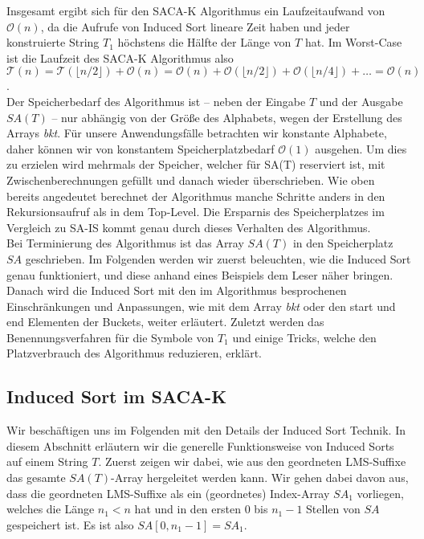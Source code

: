 Insgesamt ergibt sich für den SACA-K Algorithmus ein Laufzeitaufwand von $\mathcal O(n)$, da die Aufrufe von Induced Sort lineare Zeit haben und jeder konstruierte String $T_1$ höchstens die Hälfte der Länge von $T$ hat. Im Worst-Case ist die Laufzeit des SACA-K Algorithmus also $\mathcal T(n) = \mathcal T(\lfloor n/2 \rfloor) + \mathcal O(n) = \mathcal O(n) + \mathcal O(\lfloor n/2 \rfloor) + \mathcal O(\lfloor n/4 \rfloor) + \ldots = \mathcal O(n)$. \\
Der Speicherbedarf des Algorithmus ist -- neben der Eingabe $T$ und der Ausgabe $SA(T)$ -- nur abhängig von der Größe des Alphabets, wegen der Erstellung des Arrays \textit{bkt}. Für unsere Anwendungsfälle betrachten wir konstante Alphabete, daher können wir von konstantem Speicherplatzbedarf $\mathcal O(1)$ ausgehen. Um dies zu erzielen wird mehrmals der Speicher, welcher für SA(T) reserviert ist, mit Zwischenberechnungen gefüllt und danach wieder überschrieben. Wie oben bereits angedeutet berechnet der Algorithmus manche Schritte anders in den Rekursionsaufruf als in dem Top-Level. Die Ersparnis des Speicherplatzes im Vergleich zu SA-IS kommt genau durch dieses Verhalten des Algorithmus. \\

Bei Terminierung des Algorithmus ist das Array $SA(T)$ in den Speicherplatz $SA$ geschrieben. Im Folgenden werden wir zuerst beleuchten, wie die Induced Sort genau funktioniert, und diese anhand eines Beispiels dem Leser näher bringen. Danach wird die Induced Sort mit den im Algorithmus besprochenen Einschränkungen und Anpassungen, wie mit dem Array \textit{bkt} oder den start und end Elementen der Buckets, weiter erläutert. Zuletzt werden das Benennungsverfahren für die Symbole von $T_1$ und einige Tricks, welche den Platzverbrauch des Algorithmus reduzieren, erklärt.

\subsection{Induced Sort im SACA-K}

Wir beschäftigen uns im Folgenden mit den Details der Induced Sort Technik. In diesem Abschnitt erläutern wir die generelle Funktionsweise von Induced Sorts auf einem String $T$. Zuerst zeigen wir dabei, wie aus den geordneten LMS-Suffixe das gesamte $SA(T)$-Array hergeleitet werden kann. Wir gehen dabei davon aus, dass die geordneten LMS-Suffixe als ein (geordnetes) Index-Array $SA_1$ vorliegen, welches die Länge $n_1 < n$ hat und in den ersten $0$ bis $n_1-1$ Stellen von $SA$ gespeichert ist. Es ist also $SA[0,n_1-1] = SA_1$. \pagebreak


